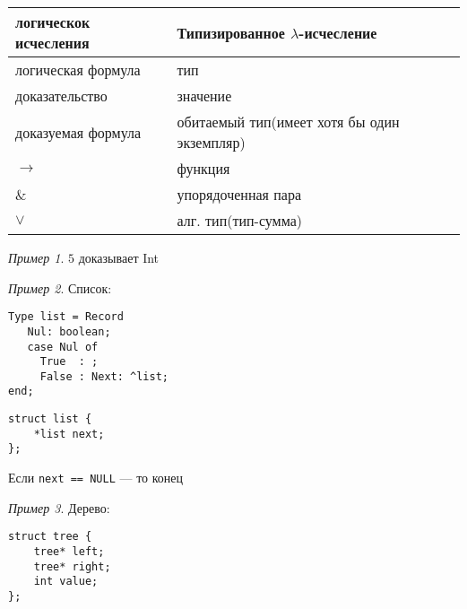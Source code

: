 \documentclass[oneside]{book}
\theoremstyle{plain}
\theoremstyle{remark}
\newtheorem*{examp}{Пример}
\theoremstyle{definition}
\begin{document}
\begin{center}
\begin{tabular}{ll}
логическок исчесления & Типизированное \(\lambda\)-исчесление\\
\hline
логическая формула & тип\\
доказательство & значение\\
доказуемая формула & обитаемый тип(имеет хотя бы один экземпляр)\\
\(\to\) & функция\\
\& & упорядоченная пара\\
\(\vee\) & алг. тип(тип-сумма)\\
\end{tabular}
\end{center}
\begin{examp}
\(5\) доказывает Int
\end{examp}
\begin{examp}
Список:
\begin{verbatim}
Type list = Record
   Nul: boolean;
   case Nul of
     True  : ;
     False : Next: ^list;
end;
\end{verbatim}
\begin{verbatim}
struct list {
	*list next;
};
\end{verbatim}
Если \texttt{next == NULL} --- то конец
\end{examp}
\begin{examp}
Дерево:
\begin{verbatim}
struct tree {
	tree* left;
	tree* right;
	int value;
};
\end{verbatim}
\end{examp}
\end{document}
